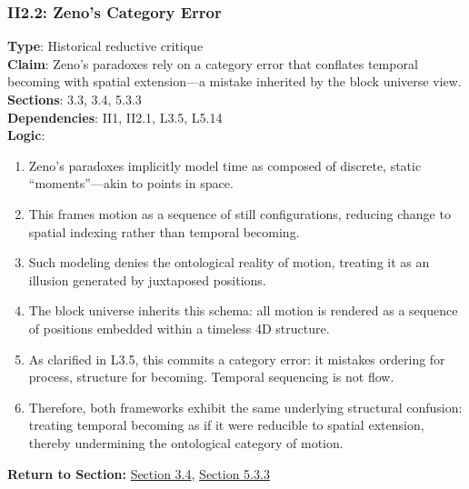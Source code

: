 \documentclass[12pt]{book}
\begin{document}
\subsubsection*{II2.2: Zeno's Category Error}
\label{appendix:II2.2}
\textbf{Type}: Historical reductive critique\\
\textbf{Claim}: Zeno's paradoxes rely on a category error that conflates temporal becoming with spatial extension---a mistake inherited by the block universe view.\\
\textbf{Sections}: 3.3, 3.4, 5.3.3\\
\textbf{Dependencies}: II1, II2.1, L3.5, L5.14\\
\textbf{Logic}:
\begin{enumerate}
    \item Zeno's paradoxes implicitly model time as composed of discrete, static ``moments''---akin to points in space.
    \item This frames motion as a sequence of still configurations, reducing change to spatial indexing rather than temporal becoming.
    \item Such modeling denies the ontological reality of motion, treating it as an illusion generated by juxtaposed positions.
    \item The block universe inherits this schema: all motion is rendered as a sequence of positions embedded within a timeless 4D structure.
    \item As clarified in L3.5, this commits a category error: it mistakes ordering for process, structure for becoming. Temporal sequencing is not flow.
    \item Therefore, both frameworks exhibit the same underlying structural confusion: treating temporal becoming as if it were reducible to spatial extension, thereby undermining the ontological category of motion.
\end{enumerate}
\textbf{Return to Section:} \hyperref[sec:3.4]{Section 3.4}, \hyperref[sec:5.3.3]{Section 5.3.3}
\end{document}
